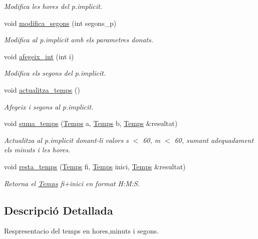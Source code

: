 \begin{DoxyCompactItemize}
\begin{DoxyCompactList}\small\item\em Modifica les hores del p.\-implicit. \end{DoxyCompactList}\item 
void \hyperlink{class_temps_aa8a974348f379f4028bf7a382dbd1848}{modifica\-\_\-segons} (int segons\-\_\-p)
\begin{DoxyCompactList}\small\item\em Modifica al p.\-implicit amb els parametres donats. \end{DoxyCompactList}\item 
void \hyperlink{class_temps_af0d27c50348e09dc9c78cfe82afd3dde}{afegeix\-\_\-int} (int i)
\begin{DoxyCompactList}\small\item\em Modifica els segons del p.\-implicit. \end{DoxyCompactList}\item 
void \hyperlink{class_temps_a62ec506363f8647c8bb4b02d1449cab4}{actualitza\-\_\-temps} ()
\begin{DoxyCompactList}\small\item\em Afegeix i segons al p.\-implicit. \end{DoxyCompactList}\item 
void \hyperlink{class_temps_a875a45e7046f4183c5d161cb0733dbb7}{suma\-\_\-temps} (\hyperlink{class_temps}{Temps} a, \hyperlink{class_temps}{Temps} b, \hyperlink{class_temps}{Temps} \&resultat)
\begin{DoxyCompactList}\small\item\em Actualitza al p.\-implicit donant-\/li valors s $<$ 60, m $<$ 60, sumant adequadament els minuts i les hores. \end{DoxyCompactList}\item 
void \hyperlink{class_temps_a2ac2998519c99b726dd9d2dcbda48194}{resta\-\_\-temps} (\hyperlink{class_temps}{Temps} fi, \hyperlink{class_temps}{Temps} inici, \hyperlink{class_temps}{Temps} \&resultat)
\begin{DoxyCompactList}\small\item\em Retorna el \hyperlink{class_temps}{Temps} fi+inici en format H\-:\-M\-:S. \end{DoxyCompactList}\end{DoxyCompactItemize}


\subsection{Descripció Detallada}
Respresentacio del temps en hores,minuts i segons. 


